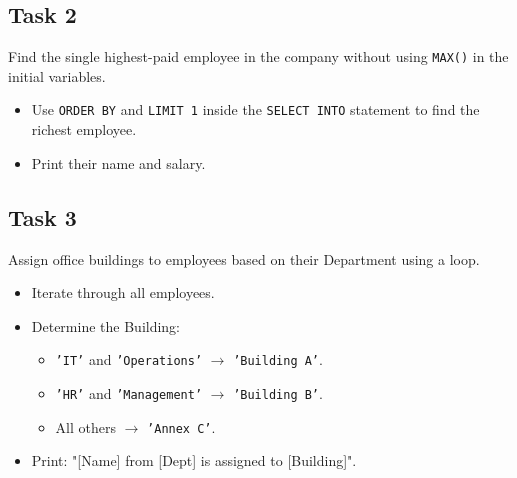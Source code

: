 \documentclass[12pt,a4paper]{article}
\newif\ifshowsolutions
\begin{document}
\subsection*{Task 2}
Find the single highest-paid employee in the company without using \texttt{MAX()} in the initial variables.
\begin{itemize}
    \item Use \texttt{ORDER BY} and \texttt{LIMIT 1} inside the \texttt{SELECT INTO} statement to find the richest employee.
    \item Print their name and salary.
\end{itemize}

\ifshowsolutions
\textbf{Solution:}
\begin{lstlisting}[language=SQL]
DO $$ 
DECLARE
    v_name TEXT;
    v_salary NUMERIC;
BEGIN
    SELECT first_name, salary 
    INTO v_name, v_salary
    FROM employees 
    ORDER BY salary DESC 
    LIMIT 1;

    RAISE NOTICE 'Highest Earner is % with a salary of %', v_name, v_salary;
END $$;
\end{lstlisting}
\fi

\subsection*{Task 3}
Assign office buildings to employees based on their Department using a loop.
\begin{itemize}
    \item Iterate through all employees.
    \item Determine the Building:
    \begin{itemize}
        \item \texttt{'IT'} and \texttt{'Operations'} $\rightarrow$ \texttt{'Building A'}.
        \item \texttt{'HR'} and \texttt{'Management'} $\rightarrow$ \texttt{'Building B'}.
        \item All others $\rightarrow$ \texttt{'Annex C'}.
    \end{itemize}
    \item Print: "[Name] from [Dept] is assigned to [Building]".
\end{itemize}

\ifshowsolutions
\textbf{Solution:}
\begin{lstlisting}[language=SQL]
DO $$ 
DECLARE
    r RECORD;
    v_building TEXT;
BEGIN
    FOR r IN SELECT first_name, department FROM employees LOOP
        
        CASE r.department
            WHEN 'IT', 'Operations' THEN
                v_building := 'Building A';
            WHEN 'HR', 'Management' THEN
                v_building := 'Building B';
            ELSE
                v_building := 'Annex C';
        END CASE;

        RAISE NOTICE '% from % is assigned to %', r.first_name, r.department, v_building;
    END LOOP;
END $$;
\end{lstlisting}
\fi
\end{document}

